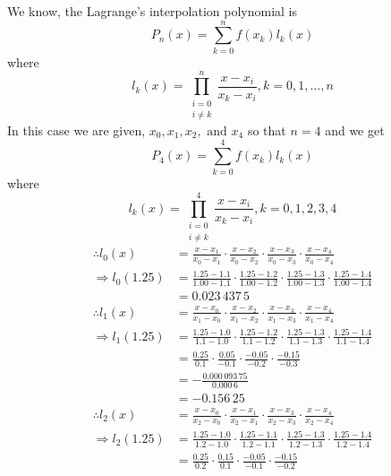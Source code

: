 \documentclass[12pt,class=book,crop=false]{standalone}
\begin{document}
\begin{soln}
    We know, the Lagrange's interpolation polynomial is
    \[
        P_n(x)=\sum_{k=0}^nf(x_k)l_k(x)
    \]
    where
    \[
        l_k(x)=\prod_{\substack{i=0\\ i\neq k}}^n\frac{x-x_i}{x_k-x_i}, k=0,1,\dots,n
    \]
    In this case we are given, \(  x_0,x_1,x_2,\text{ and }x_4 \) so that \(  n=4 \) and we get
    \[
        P_4(x)=\sum_{k=0}^4f(x_k)l_k(x)
    \]
    where
    \[
        l_k(x)=\prod_{\substack{i=0\\ i\neq k}}^4\frac{x-x_i}{x_k-x_i}, k=0,1,2,3,4
    \]
    \begin{align*}
        \therefore l_0(x)     & = \frac{x-x_1}{x_0-x_1}\cdot\frac{x-x_2}{x_0-x_2}\cdot\frac{x-x_3}{x_0-x_3}\cdot\frac{x-x_4}{x_0-x_4}                 \\
        \Rightarrow l_0(1.25) & = \frac{1.25-1.1}{1.00-1.1}\cdot\frac{1.25-1.2}{1.00-1.2}\cdot\frac{1.25-1.3}{1.00-1.3}\cdot\frac{1.25-1.4}{1.00-1.4} \\
                              & = 0.023\,437\,5
    \end{align*}
    \begin{align*}
        \therefore l_1(x)     & = \frac{x-x_0}{x_1-x_0}\cdot\frac{x-x_2}{x_1-x_2}\cdot\frac{x-x_3}{x_1-x_3}\cdot\frac{x-x_4}{x_1-x_4}             \\
        \Rightarrow l_1(1.25) & = \frac{1.25-1.0}{1.1-1.0}\cdot\frac{1.25-1.2}{1.1-1.2}\cdot\frac{1.25-1.3}{1.1-1.3}\cdot\frac{1.25-1.4}{1.1-1.4} \\
                              & = \frac{0.25}{0.1}\cdot\frac{0.05}{-0.1}\cdot\frac{-0.05}{-0.2}\cdot\frac{-0.15}{-0.3}                             \\
                              & = -\frac{0.000\,093\,75}{0.000\,6}                                                                                      \\
                              & = -0.156\,25
    \end{align*}
    \begin{align*}
        \therefore l_2(x)     & = \frac{x-x_0}{x_2-x_0}\cdot\frac{x-x_1}{x_2-x_1}\cdot\frac{x-x_3}{x_2-x_3}\cdot\frac{x-x_4}{x_2-x_4}             \\
        \Rightarrow l_2(1.25) & = \frac{1.25-1.0}{1.2-1.0}\cdot\frac{1.25-1.1}{1.2-1.1}\cdot\frac{1.25-1.3}{1.2-1.3}\cdot\frac{1.25-1.4}{1.2-1.4} \\
                              & = \frac{0.25}{0.2}\cdot\frac{0.15}{0.1}\cdot\frac{-0.05}{-0.1}\cdot\frac{-0.15}{-0.2}                             \\

\end{align*}
\end{soln}
\end{document}
